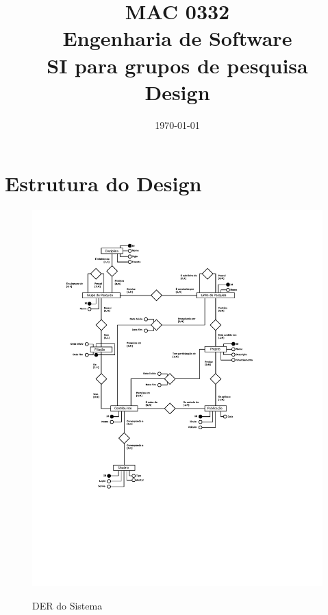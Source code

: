 \documentclass[11pt, a4paper]{article}
\title{MAC 0332\\
	Engenharia de Software\\
	SI para grupos de pesquisa\\
	Design}
\date{\today}
\begin{document}
	\maketitle
	\newpage
	
	\section{Estrutura do Design}
		
		\begin{figure}[h]
            \center
            \includegraphics[width=12cm]{SIGP-DER.pdf}
            \label{DER}
            \caption{DER do Sistema}
        \end{figure}
        \newpage
        
\end{document}
